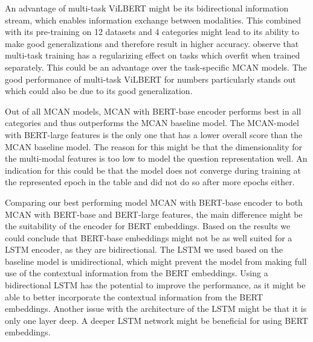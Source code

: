 \documentclass{article}
\begin{document}
An advantage of multi-task ViLBERT might be its bidirectional information stream, which enables information exchange between modalities. This combined with its pre-training on 12 datasets and 4 categories might lead to its ability to make good generalizations and therefore result in higher accuracy. \cite{lu2020multitask} observe that multi-task training has a regularizing effect on tasks which overfit when trained separately. This could be an advantage over the task-specific MCAN models. The good performance of multi-task ViLBERT for numbers particularly stands out which could also be due to its good generalization.

Out of all MCAN models, MCAN with BERT-base encoder performs best in all categories and thus outperforms the MCAN baseline model. The MCAN-model with BERT-large features is the only one that has a lower overall score than the MCAN baseline model. The reason for this might be that the dimensionality for the multi-modal features is too low to model the question representation well. An indication for this could be that the model does not converge during training at the represented epoch in the table and did not do so after more epochs either.

Comparing our best performing model MCAN with BERT-base encoder to both MCAN with BERT-base and BERT-large features, the main difference might be the suitability of the encoder for BERT embeddings. Based on the results we could conclude that BERT-base embeddings might not be as well suited for a LSTM encoder, as they are bidirectional. The LSTM we used based on the baseline model is unidirectional, which might prevent the model from making full use of the contextual information from the BERT embeddings. Using a bidirectional LSTM has the potential to improve the performance, as it might be able to better incorporate the contextual information from the BERT embeddings. Another issue with the architecture of the LSTM might be that it is only one layer deep. A deeper LSTM network might be beneficial for using BERT embeddings.

\end{document}
